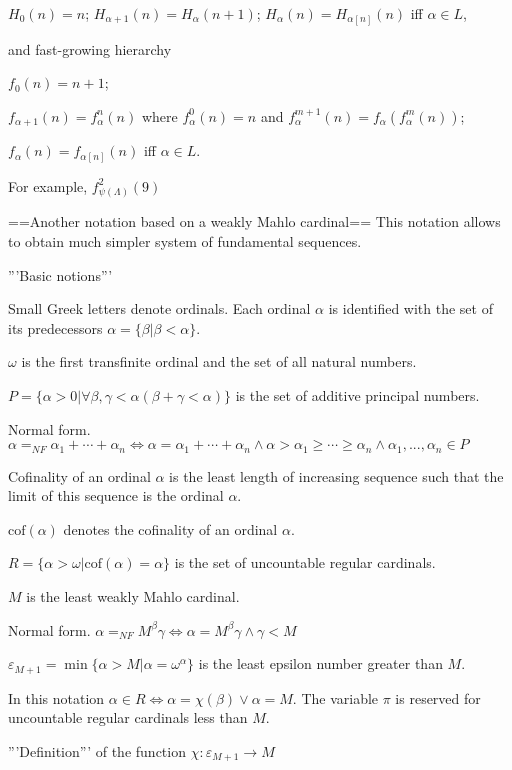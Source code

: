\documentclass[10pt]{article}
\begin{document}
\(H_0(n)=n\);  \(H_{\alpha+1}(n)=H_\alpha(n+1)\);  \(H_\alpha(n)=H_{\alpha[n]}(n)\) iff \(\alpha\in L\),

and fast-growing hierarchy

\(f_0(n)=n+1\);  

\(f_{\alpha+1}(n)=f_\alpha^n(n)\) where \(f_\alpha^0(n)=n\) and \(f_\alpha^{m+1}(n)=f_\alpha(f_\alpha^m(n))\);  

\(f_\alpha(n)=f_{\alpha[n]}(n)\) iff \(\alpha\in L\).

For example, \(f_{\psi(\Lambda)}^2(9)\)

==Another notation based on a weakly Mahlo cardinal==
This notation allows to obtain much simpler system of fundamental sequences.

'''Basic notions'''

Small Greek letters denote ordinals. Each ordinal \(\alpha\) is identified with the set of its predecessors \(\alpha=\{\beta|\beta<\alpha\}\). 

\(\omega\) is the first transfinite ordinal and the set of all natural numbers.

\(P=\{\alpha>0|\forall\beta,\gamma<\alpha(\beta+\gamma<\alpha)\}\) is the  set of additive principal numbers.

Normal form. \(\alpha=_{NF}\alpha_1+\cdots+\alpha_n\Leftrightarrow\alpha=\alpha_1+\cdots+\alpha_n\wedge\alpha>\alpha_1\geq\cdots\geq\alpha_n\wedge\alpha_1,...,\alpha_n\in P\)

Cofinality of an ordinal \(\alpha\) is the least length of increasing sequence such that the limit of this sequence is the ordinal \(\alpha\). 

\(\text{cof}(\alpha)\) denotes the cofinality of an ordinal \(\alpha\).

\(R=\{\alpha>\omega|\text{cof}(\alpha)=\alpha\}\) is the set of uncountable regular cardinals.

\(M\) is the least weakly Mahlo cardinal. 

Normal form. \(\alpha=_{NF}M^\beta\gamma\Leftrightarrow\alpha=M^\beta\gamma\wedge\gamma<M\)

\(\varepsilon_{M+1}=\min\{\alpha>M|\alpha=\omega^\alpha\}\) is the least epsilon number greater than \(M\). 

In this notation \(\alpha\in R\Leftrightarrow\alpha=\chi(\beta)\vee\alpha=M\). The variable \(\pi\) is reserved for uncountable regular cardinals less than \(M\). 

'''Definition''' of the function \(\chi:\varepsilon_{M+1}\rightarrow M\)
\end{document}
